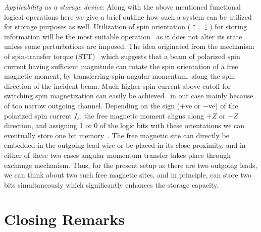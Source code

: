 \documentclass[doublecol]{epl2}
\begin{document}
\vskip 0.25cm
\noindent
{\em Applicability as a storage device:} Along with the above mentioned 
functional logical operations here we give a brief outline how such a system 
can be utilized for storage purposes as well. Utilization of spin orientation 
($\uparrow$, $\downarrow$) for storing information will be the most suitable 
operation~\cite{spin1} as it does not alter its state unless some perturbations 
are imposed. The idea originated from the mechanism of spin-transfer torque 
(STT)~\cite{stt1} which suggests that a beam of polarized spin current having 
sufficient magnitude can rotate the spin orientation of a free magnetic moment, 
by transferring spin angular momentum, along the spin direction of the incident 
beam. Much higher spin current above cutoff for switching spin magnetization 
can easily be achieved~\cite{stt1} in our case mainly because of too 
narrow outgoing channel. Depending on the sign ($+$ve or $-$ve) of the 
polarized spin current $I_s$, the free magnetic moment aligns along $+Z$ or 
$-Z$ direction, and assigning 1 or 0 of the logic bits with these orientations 
we can eventually store one bit memory~\cite{stt1,stt2,stt3,stt4}. The free 
magnetic site can directly be embedded in the outgoing lead wire or be placed 
in its close proximity, and in either of these two cases angular momentum 
transfer takes place through exchange mechanism. Thus, for the present setup 
as there are two outgoing leads, we can think about two such free magnetic 
sites, and in principle, can store two bits simultaneously which significantly 
enhances the storage capacity.

\section{Closing Remarks}
\end{document}

